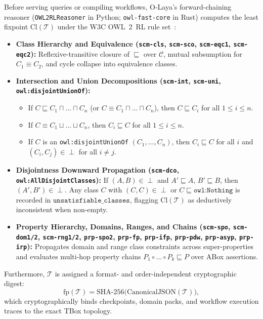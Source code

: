 \documentclass[11pt,a4paper]{article}
\begin{document}
Before serving queries or compiling workflows, O-Laya's forward-chaining reasoner (\texttt{OWL2RLReasoner} in Python; \texttt{owl-fast-core} in Rust) computes the least fixpoint $\mathrm{Cl}(\mathcal{T})$ under the W3C OWL~2~RL rule set~\cite{motik2012owl2profiles}:
\begin{itemize}[leftmargin=1.8em,itemsep=0.25em]
  \item \textbf{Class Hierarchy and Equivalence (\texttt{scm-cls}, \texttt{scm-sco}, \texttt{scm-eqc1}, \texttt{scm-eqc2}):} Reflexive-transitive closure of $\sqsubseteq$ over $\mathcal{C}$, mutual subsumption for $C_1 \equiv C_2$, and cycle collapse into equivalence classes.
  \item \textbf{Intersection and Union Decompositions (\texttt{scm-int}, \texttt{scm-uni}, \texttt{owl:disjointUnionOf}):}
  \begin{itemize}[leftmargin=1.4em,itemsep=0.15em]
    \item If $C \sqsubseteq C_1 \sqcap \dots \sqcap C_n$ (or $C \equiv C_1 \sqcap \dots \sqcap C_n$), then $C \sqsubseteq C_i$ for all $1 \le i \le n$.
    \item If $C \equiv C_1 \sqcup \dots \sqcup C_n$, then $C_i \sqsubseteq C$ for all $1 \le i \le n$.
    \item If $C$ is an \texttt{owl:disjointUnionOf} $(C_1, \dots, C_n)$, then $C_i \sqsubseteq C$ for all $i$ and $(C_i, C_j) \in \perp$ for all $i \ne j$.
  \end{itemize}
  \item \textbf{Disjointness Downward Propagation (\texttt{scm-dco}, \texttt{owl:AllDisjointClasses}):}
  If $(A, B) \in \perp$ and $A' \sqsubseteq A$, $B' \sqsubseteq B$, then $(A', B') \in \perp$. Any class $C$ with $(C, C) \in \perp$ or $C \sqsubseteq \texttt{owl:Nothing}$ is recorded in $\texttt{unsatisfiable\_classes}$, flagging $\mathrm{Cl}(\mathcal{T})$ as deductively inconsistent when non-empty.
  \item \textbf{Property Hierarchy, Domains, Ranges, and Chains (\texttt{scm-spo}, \texttt{scm-dom1/2}, \texttt{scm-rng1/2}, \texttt{prp-spo2}, \texttt{prp-fp}, \texttt{prp-ifp}, \texttt{prp-pdw}, \texttt{prp-asyp}, \texttt{prp-irp}):} Propagates domain and range class constraints across super-properties and evaluates multi-hop property chains $P_1 \circ \dots \circ P_k \sqsubseteq P$ over ABox assertions.
\end{itemize}

Furthermore, $\mathcal{T}$ is assigned a format- and order-independent cryptographic digest:
\begin{equation}
  \mathrm{fp}(\mathcal{T}) = \mathrm{SHA\text{-}256}\bigl(\mathrm{CanonicalJSON}(\mathcal{T})\bigr),
\end{equation}
which cryptographically binds checkpoints, domain packs, and workflow execution traces to the exact TBox topology.
\end{document}
